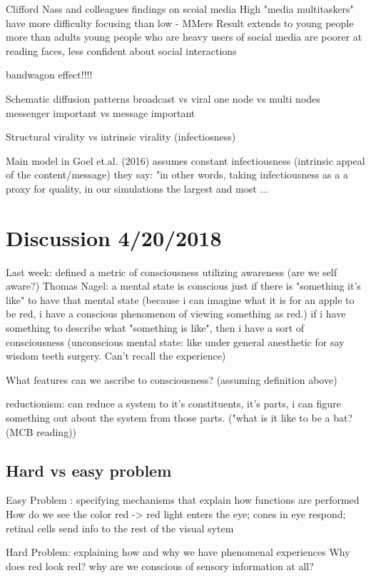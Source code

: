 \documentclass{article}
\begin{document}
Clifford Nass and colleagues findings on scoial media 
High "media multitaskers" have more difficulty focusing than low - MMers
Result extends to young people more than adults 
young people who are heavy users of social media are poorer at reading faces, less confident about social interactions

bandwagon effect!!!!

Schematic diffusion patterns
broadcast vs viral
one node vs multi nodes
messenger important vs message important

Structural virality vs intrinsic virality (infectiosness) 

Main model in Goel et.al. (2016) assumes constant infectiousness (intrinsic appeal of the content/message) 
they say: "in other words, taking infectiousness as a a proxy for quality, in our simulations the largest and most ...



\section{Discussion 4/20/2018}
Last week: defined a metric of consciousness utilizing awareness (are we self aware?) 
Thomas Nagel: a mental state is conscious just if there is "something it's like" to have that mental state
(because i can imagine what it is for an apple to be red, i have a conscious phenomenon of viewing something as red.) 
if i have something to describe what "something is like", then i have a sort of consciousness
(unconscious mental state: like under general anesthetic for say wisdom teeth surgery. Can't recall the experience)

What features can we ascribe to consciousness? (assuming definition above) 

reductionism: can reduce a system to it's constituents, it's parts, i can figure something out about the system from those parts. 
("what is it like to be a bat? (MCB reading)) 

\subsection{Hard vs easy problem}

Easy Problem : specifying mechanisms that explain how functions are performed
    How do  we see the color red -> red light enters the eye; cones in eye respond; retinal cells send info to the rest of the visual sytem
    
Hard Problem: explaining how and why we have phenomenal experiences
    Why does red look red?
    why are we conscious of sensory information at all?
    
\end{document}
